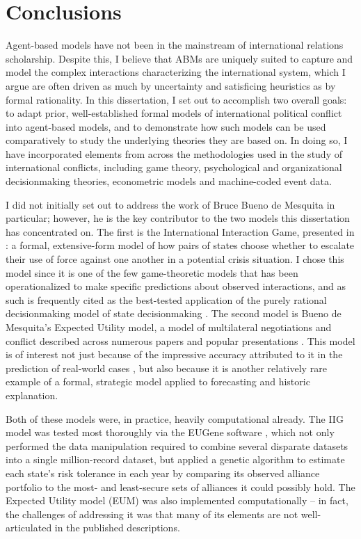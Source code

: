 \chapter{Conclusions}

Agent-based models have not been in the mainstream of international relations scholarship. Despite this, I believe that ABMs are uniquely suited to capture and model the complex interactions characterizing the international system, which I argue are often driven as much by uncertainty and satisficing heuristics as by formal rationality. In this dissertation, I set out to accomplish two overall goals: to adapt prior, well-established formal models of international political conflict into agent-based models, and to demonstrate how such models can be used comparatively to study the underlying theories they are based on. In doing so, I have incorporated elements from across the methodologies used in the study of international conflicts, including game theory, psychological and organizational decisionmaking theories, econometric models and machine-coded event data.

I did not initially set out to address the work of Bruce Bueno de Mesquita in particular; however, he is the key contributor to the two models this dissertation has concentrated on. The first is the International Interaction Game, presented in \citet{bdm_1992}: a formal, extensive-form model of how pairs of states choose whether to escalate their use of force against one another in a potential crisis situation. I chose this model since it is one of the few game-theoretic models that has been operationalized to make specific predictions about observed interactions, and as such is frequently cited as the best-tested application of the purely rational decisionmaking model of state decisionmaking \citep[e.g.][]{allison_1999,green_1996}. The second model is Bueno de Mesquita's Expected Utility model, a model of multilateral negotiations and conflict described across numerous papers \citep{bdm_1984,bdm_1994,bdm_1997,bdm_2002,bdm_2011} and popular presentations \citep{bdm_2009,bdm_2010}. This model is of interest not just because of the impressive accuracy attributed to it in the prediction of real-world cases \citep{bdm_2009,feder_1992}, but also because it is another relatively rare example of a formal, strategic model applied to forecasting and historic explanation.

Both of these models were, in practice, heavily computational already. The IIG model was tested most thoroughly via the EUGene software \citep{bennett_2000,bennett_2000b}, which not only performed the data manipulation required to combine several disparate datasets into a single million-record dataset, but applied a genetic algorithm to estimate each state's risk tolerance in each year by comparing its observed alliance portfolio to the most- and least-secure sets of alliances it could possibly hold. The Expected Utility model (EUM) was also implemented computationally -- in fact, the challenges of addressing it was that many of its elements are not well-articulated in the published descriptions.

